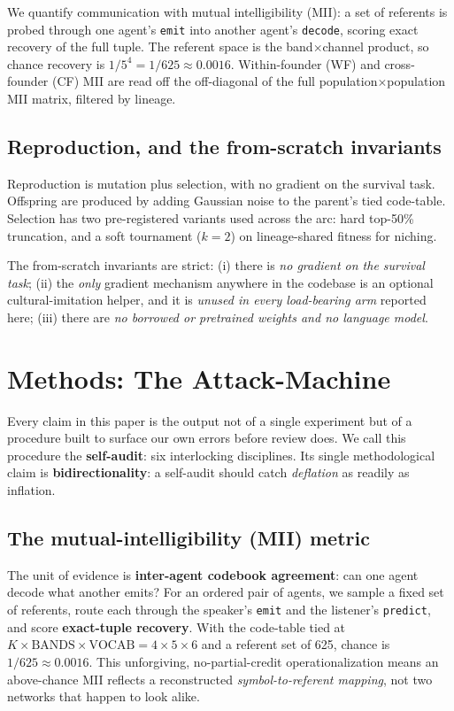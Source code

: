 \documentclass[12pt,letterpaper]{article}
\begin{document}
We quantify communication with mutual intelligibility (MII): a set of referents is probed
through one agent's \texttt{emit} into another agent's \texttt{decode}, scoring exact
recovery of the full tuple. The referent space is the band$\times$channel product, so
chance recovery is $1/5^4 = 1/625 \approx 0.0016$. Within-founder (WF) and cross-founder
(CF) MII are read off the off-diagonal of the full population$\times$population MII matrix,
filtered by lineage.

\subsection{Reproduction, and the from-scratch invariants}

Reproduction is mutation plus selection, with no gradient on the survival task. Offspring
are produced by adding Gaussian noise to the parent's tied code-table. Selection has two
pre-registered variants used across the arc: hard top-50\% truncation, and a soft
tournament ($k{=}2$) on lineage-shared fitness for niching.

The from-scratch invariants are strict: (i) there is \emph{no gradient on the survival
task}; (ii) the \emph{only} gradient mechanism anywhere in the codebase is an optional
cultural-imitation helper, and it is \emph{unused in every load-bearing arm} reported here;
(iii) there are \emph{no borrowed or pretrained weights and no language model}.

\section{Methods: The Attack-Machine}

Every claim in this paper is the output not of a single experiment but of a procedure built
to surface our own errors before review does. We call this procedure the
\textbf{self-audit}: six interlocking disciplines. Its single methodological claim is
\textbf{bidirectionality}: a self-audit should catch \emph{deflation} as readily as
inflation.

\subsection{The mutual-intelligibility (MII) metric}

The unit of evidence is \textbf{inter-agent codebook agreement}: can one agent decode what
another emits? For an ordered pair of agents, we sample a fixed set of referents, route each
through the speaker's \texttt{emit} and the listener's \texttt{predict}, and score
\textbf{exact-tuple recovery}. With the code-table tied at $K\times\text{BANDS}\times\text{VOCAB} = 4\times5\times6$ and a referent set of 625, chance is $1/625 \approx 0.0016$.
This unforgiving, no-partial-credit operationalization means an above-chance MII reflects a
reconstructed \emph{symbol-to-referent mapping}, not two networks that happen to look alike.
\end{document}
